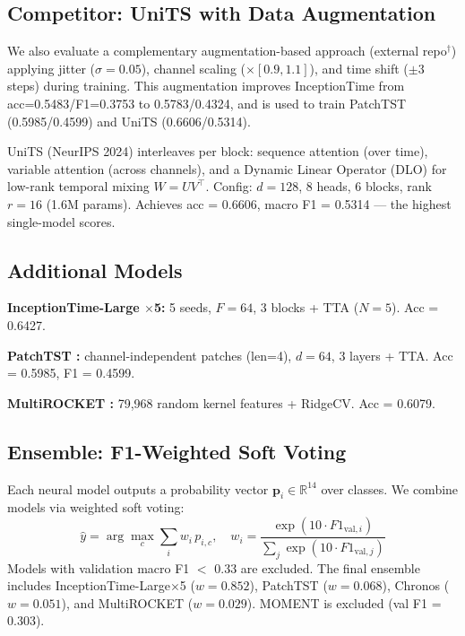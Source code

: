 \documentclass{article}
\begin{document}
\subsection{Competitor: UniTS with Data Augmentation}

We also evaluate a complementary augmentation-based approach (external
repo$^\dagger$) applying jitter ($\sigma{=}0.05$), channel scaling (${\times}[0.9,1.1]$),
and time shift (${\pm}3$ steps) during training.
This augmentation improves InceptionTime from acc=0.5483/F1=0.3753 to 0.5783/0.4324,
and is used to train PatchTST (0.5985/0.4599) and UniTS (0.6606/0.5314).

UniTS \citep{units} (NeurIPS 2024) interleaves per block: sequence attention
(over time), variable attention (across channels), and a Dynamic Linear
Operator (DLO) for low-rank temporal mixing $W{=}UV^\top$.
Config: $d{=}128$, 8 heads, 6 blocks, rank $r{=}16$ (1.6M params).
Achieves acc = 0.6606, macro F1 = 0.5314 — the highest single-model scores.

\subsection{Additional Models}

\textbf{InceptionTime-Large $\times$5:} 5 seeds, $F{=}64$, 3 blocks + TTA ($N{=}5$). Acc = 0.6427.

\textbf{PatchTST \citep{patchtst}:} channel-independent patches (len=4), $d{=}64$, 3 layers + TTA. Acc = 0.5985, F1 = 0.4599.

\textbf{MultiROCKET \citep{rocket}:} 79,968 random kernel features + RidgeCV. Acc = 0.6079.

\subsection{Ensemble: F1-Weighted Soft Voting}

Each neural model outputs a probability vector $\mathbf{p}_i \in \mathbb{R}^{14}$
over classes. We combine models via weighted soft voting:
\begin{equation}
  \hat{y} = \arg\max_c \sum_i w_i\, p_{i,c},
  \quad
  w_i = \frac{\exp(10 \cdot F1_{\text{val},i})}{\sum_j \exp(10 \cdot F1_{\text{val},j})}
  \label{eq:ensemble}
\end{equation}
Models with validation macro F1 $<$ 0.33 are excluded.
The final ensemble includes InceptionTime-Large$\times$5 ($w{=}0.852$),
PatchTST ($w{=}0.068$), Chronos ($w{=}0.051$), and MultiROCKET ($w{=}0.029$).
MOMENT is excluded (val F1 = 0.303).
\end{document}
